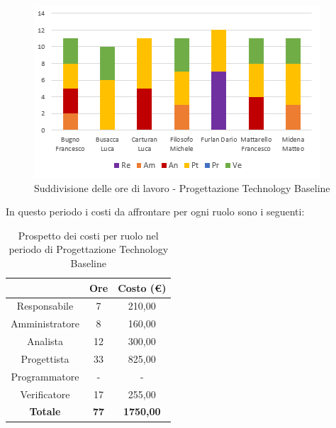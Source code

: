    \begin{figure}[H]
       \centering
        \includegraphics[scale=1.2]{immagini/ore_lavoro_TB.png}
        \caption{Suddivisione delle ore di lavoro - Progettazione Technology Baseline}
      \end{figure}
   
\pagebreak
   In questo periodo i costi da affrontare per ogni ruolo sono i seguenti:
   
   \begin{table}[H]
       \centering
       \renewcommand{\arraystretch}{1.8}
       \begin{tabular}{c|c|c}
         \rowcolor[HTML]{125E28} 
         \multicolumn{1}{c}{\color[HTML]{FFFFFF}\textbf{Ruolo}}
         & \multicolumn{1}{c}{\color[HTML]{FFFFFF}\textbf{Ore}}
         & \multicolumn{1}{c}{\color[HTML]{FFFFFF}\textbf{Costo (€)}}\\
         \hline
         Responsabile   & 7 & 210,00\\
         Amministratore & 8 & 160,00\\
         Analista       & 12 & 300,00\\
         Progettista    & 33 & 825,00\\
         Programmatore  & - & -\\
         Verificatore   & 17 & 255,00\\
         \textbf{Totale} & \textbf{77} & \textbf{1750,00}
       \end{tabular}
       \caption{Prospetto dei costi per ruolo nel periodo di Progettazione Technology Baseline}
     \end{table}
   
